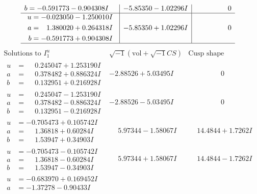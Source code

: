 \documentclass[1p]{elsarticle_modified}
\theoremstyle{definition}
\newcommand{\I}{\sqrt{-1}}
\begin{document}
$$\begin{array}{c|c|c}
\begin{aligned}
b &= -0.591773 - 0.904308 I\end{aligned}
 & -5.85350 - 1.02296 I & \phantom{-0.000000 } 0 \\ \hline\begin{aligned}
u &= -0.023050 - 1.250010 I \\
a &= \phantom{-}1.380020 + 0.264318 I \\
b &= -0.591773 + 0.904308 I\end{aligned}
 & -5.85350 + 1.02296 I & \phantom{-0.000000 } 0\\
 \hline 
 \end{array}$$\newpage$$\begin{array}{c|c|c}  
\text{Solutions to }I^u_{1}& \I (\text{vol} + \sqrt{-1}CS) & \text{Cusp shape}\\
 \hline 
\begin{aligned}
u &= \phantom{-}0.245047 + 1.253190 I \\
a &= \phantom{-}0.378482 + 0.886324 I \\
b &= \phantom{-}0.132951 + 0.216928 I\end{aligned}
 & -2.88526 + 5.03495 I & \phantom{-0.000000 } 0 \\ \hline\begin{aligned}
u &= \phantom{-}0.245047 - 1.253190 I \\
a &= \phantom{-}0.378482 - 0.886324 I \\
b &= \phantom{-}0.132951 - 0.216928 I\end{aligned}
 & -2.88526 - 5.03495 I & \phantom{-0.000000 } 0 \\ \hline\begin{aligned}
u &= -0.705473 + 0.105742 I \\
a &= \phantom{-}1.36818 + 0.60284 I \\
b &= \phantom{-}1.53947 + 0.34903 I\end{aligned}
 & \phantom{-}5.97344 - 1.58067 I & \phantom{-}14.4844 + 1.7262 I \\ \hline\begin{aligned}
u &= -0.705473 - 0.105742 I \\
a &= \phantom{-}1.36818 - 0.60284 I \\
b &= \phantom{-}1.53947 - 0.34903 I\end{aligned}
 & \phantom{-}5.97344 + 1.58067 I & \phantom{-}14.4844 - 1.7262 I \\ \hline\begin{aligned}
u &= -0.683970 + 0.169452 I \\
a &= -1.37278 - 0.90433 I \\

\end{aligned}
\end{array}$$
\end{document}
